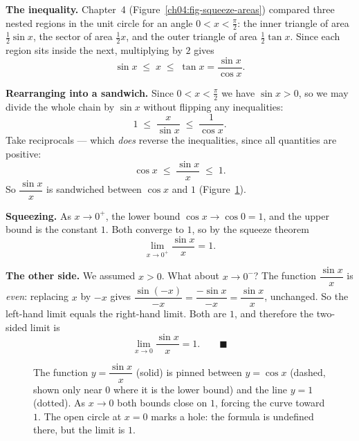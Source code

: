 \textbf{The inequality.} Chapter~4 (Figure~\ref{ch04:fig-squeeze-areas}) compared three
nested regions in the unit circle for an angle $0<x<\frac{\pi}{2}$: the inner triangle
of area $\tfrac12\sin x$, the sector of area $\tfrac12 x$, and the outer triangle of
area $\tfrac12\tan x$. Since each region sits inside the next, multiplying by $2$ gives
\[
  \sin x \;\le\; x \;\le\; \tan x = \frac{\sin x}{\cos x}.
\]

\textbf{Rearranging into a sandwich.} Since $0<x<\frac\pi2$ we have
$\sin x > 0$, so we may divide the whole chain by $\sin x$ without flipping any
inequalities:
\[
  1 \;\le\; \frac{x}{\sin x} \;\le\; \frac{1}{\cos x}.
\]
Take reciprocals --- which \emph{does} reverse the inequalities, since all
quantities are positive:
\[
  \cos x \;\le\; \frac{\sin x}{x} \;\le\; 1.
\]
So $\dfrac{\sin x}{x}$ is sandwiched between $\cos x$ and $1$
(Figure~\ref{ch07:fig-sinx}).

\textbf{Squeezing.} As $x\to 0^{+}$, the lower bound $\cos x \to \cos 0 = 1$,
and the upper bound is the constant $1$. Both converge to $1$, so by the
squeeze theorem
\[
  \lim_{x\to 0^{+}}\frac{\sin x}{x} = 1.
\]

\textbf{The other side.} We assumed $x>0$. What about $x\to 0^{-}$? The
function $\dfrac{\sin x}{x}$ is \emph{even}: replacing $x$ by $-x$ gives
$\dfrac{\sin(-x)}{-x} = \dfrac{-\sin x}{-x} = \dfrac{\sin x}{x}$, unchanged. So
the left-hand limit equals the right-hand limit. Both are $1$, and therefore
the two-sided limit is
\[
  \lim_{x\to 0}\frac{\sin x}{x} = 1. \qquad\blacksquare
\]

\begin{figure}[htbp]
\centering
{}
\caption{The function $y=\dfrac{\sin x}{x}$ (solid) is pinned between
$y=\cos x$ (dashed, shown only near $0$ where it is the lower bound) and the
line $y=1$ (dotted). As $x\to 0$ both bounds close on $1$, forcing the curve
toward $1$. The open circle at $x=0$ marks a hole: the formula is
undefined there, but the limit is $1$.}
\label{ch07:fig-sinx}
\end{figure}

